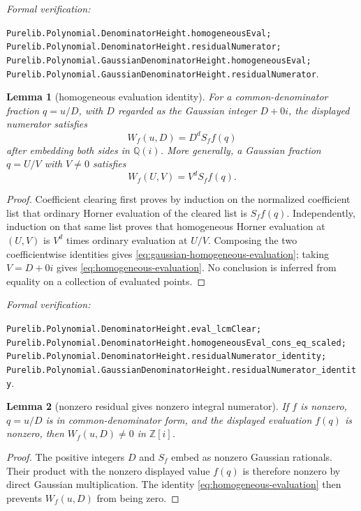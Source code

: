 \documentclass[11pt]{article}
\newtheorem{lemma}[lemma]{Lemma}
\newcommand{\Qi}{\mathbb{Q}(i)}
\newcommand{\Zi}{\mathbb{Z}[i]}
\newcommand{\leanref}[1]{\par\smallskip\noindent
  \emph{Formal verification:}\par\nobreak
  {\raggedright\nolinkurl{#1}.\par}}
\begin{document}
\leanref{Purelib.Polynomial.DenominatorHeight.homogeneousEval;
Purelib.Polynomial.DenominatorHeight.residualNumerator;
Purelib.Polynomial.GaussianDenominatorHeight.homogeneousEval;
Purelib.Polynomial.GaussianDenominatorHeight.residualNumerator}

\begin{lemma}[homogeneous evaluation identity]
\label{lem:homogeneous-evaluation}
For a common-denominator fraction $q=u/D$, with $D$ regarded as the Gaussian
integer $D+0i$, the displayed numerator satisfies
\begin{equation}
\label{eq:homogeneous-evaluation}
                        W_f(u,D)=D^dS_ff(q)
\end{equation}
after embedding both sides in $\Qi$.  More generally, a Gaussian fraction
$q=U/V$ with $V\ne0$ satisfies
\begin{equation}
\label{eq:gaussian-homogeneous-evaluation}
                        W_f(U,V)=V^dS_ff(q).
\end{equation}
\end{lemma}

\begin{proof}
Coefficient clearing first proves by induction on the normalized coefficient
list that ordinary Horner evaluation of the cleared list is $S_ff(q)$.
Independently, induction on that same list proves that homogeneous Horner
evaluation at $(U,V)$ is $V^d$ times ordinary evaluation at $U/V$.  Composing
the two coefficientwise identities gives
\eqref{eq:gaussian-homogeneous-evaluation}; taking $V=D+0i$ gives
\eqref{eq:homogeneous-evaluation}.  No conclusion is inferred from equality
on a collection of evaluated points.
\end{proof}

\leanref{Purelib.Polynomial.DenominatorHeight.eval_lcmClear;
Purelib.Polynomial.DenominatorHeight.homogeneousEval_cons_eq_scaled;
Purelib.Polynomial.DenominatorHeight.residualNumerator_identity;
Purelib.Polynomial.GaussianDenominatorHeight.residualNumerator_identity}

\begin{lemma}[nonzero residual gives nonzero integral numerator]
\label{lem:residual-numerator-nonzero}
If $f$ is nonzero, $q=u/D$ is in common-denominator form, and the displayed
evaluation $f(q)$ is nonzero, then $W_f(u,D)\ne0$ in $\Zi$.
\end{lemma}

\begin{proof}
The positive integers $D$ and $S_f$ embed as nonzero Gaussian rationals.
Their product with the nonzero displayed value $f(q)$ is therefore nonzero by
direct Gaussian multiplication.  The identity
\eqref{eq:homogeneous-evaluation} then prevents $W_f(u,D)$ from being zero.
\end{proof}
\end{document}
